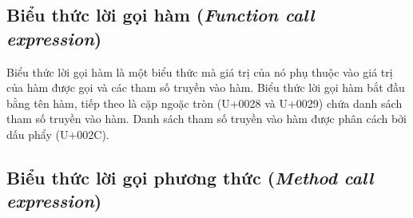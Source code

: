 \subsection{Biểu thức lời gọi hàm (\textit{Function call expression})}

\regexfuncallexpr

Biểu thức lời gọi hàm là một biểu thức mà giá trị của nó phụ thuộc vào giá trị của hàm được gọi và các tham số truyền vào hàm. Biểu thức lời gọi hàm bắt đầu bằng tên hàm, tiếp theo là cặp ngoặc tròn (U+0028 và U+0029) chứa danh sách tham số truyền vào hàm. Danh sách tham số truyền vào hàm được phân cách bởi dấu phẩy (U+002C).

\subsection{Biểu thức lời gọi phương thức (\textit{Method call expression})}
